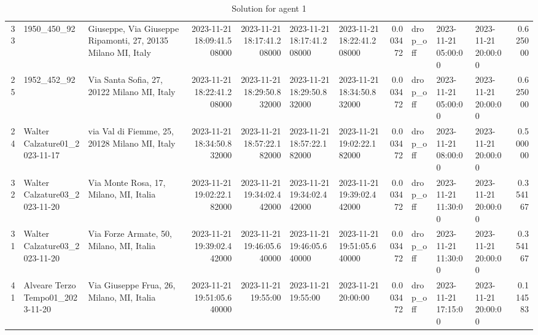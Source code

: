 \documentclass[titlepage]{article}
\begin{document}
\begin{table}[H]
\begin{adjustbox}{max width=\textwidth}
\begin{tabular}{rllrrllrlllr}
33 & 1950\_450\_92 & Giuseppe, Via Giuseppe Ripamonti, 27, 20135 Milano MI, Italy & 2023-11-21 18:09:41.508000 & 2023-11-21 18:17:41.208000 & 2023-11-21 18:17:41.208000 & 2023-11-21 18:22:41.208000 & 0.003472 & drop\_off & 2023-11-21 05:00:00 & 2023-11-21 20:00:00 & 0.625000 \\
25 & 1952\_452\_92 & Via Santa Sofia, 27, 20122 Milano MI, Italy & 2023-11-21 18:22:41.208000 & 2023-11-21 18:29:50.832000 & 2023-11-21 18:29:50.832000 & 2023-11-21 18:34:50.832000 & 0.003472 & drop\_off & 2023-11-21 05:00:00 & 2023-11-21 20:00:00 & 0.625000 \\
24 & Walter Calzature01\_2023-11-17 & via Val di Fiemme, 25, 20128 Milano MI, Italy & 2023-11-21 18:34:50.832000 & 2023-11-21 18:57:22.182000 & 2023-11-21 18:57:22.182000 & 2023-11-21 19:02:22.182000 & 0.003472 & drop\_off & 2023-11-21 08:00:00 & 2023-11-21 20:00:00 & 0.500000 \\
32 & Walter Calzature03\_2023-11-20 & Via Monte Rosa, 17, Milano, MI, Italia & 2023-11-21 19:02:22.182000 & 2023-11-21 19:34:02.442000 & 2023-11-21 19:34:02.442000 & 2023-11-21 19:39:02.442000 & 0.003472 & drop\_off & 2023-11-21 11:30:00 & 2023-11-21 20:00:00 & 0.354167 \\
31 & Walter Calzature03\_2023-11-20 & Via Forze Armate, 50, Milano, MI, Italia & 2023-11-21 19:39:02.442000 & 2023-11-21 19:46:05.640000 & 2023-11-21 19:46:05.640000 & 2023-11-21 19:51:05.640000 & 0.003472 & drop\_off & 2023-11-21 11:30:00 & 2023-11-21 20:00:00 & 0.354167 \\
41 & Alveare Terzo Tempo01\_2023-11-20 & Via Giuseppe Frua, 26, Milano, MI, Italia & 2023-11-21 19:51:05.640000 & 2023-11-21 19:55:00 & 2023-11-21 19:55:00 & 2023-11-21 20:00:00 & 0.003472 & drop\_off & 2023-11-21 17:15:00 & 2023-11-21 20:00:00 & 0.114583 \\
\bottomrule
\end{tabular}
\end{adjustbox}
\caption{Solution for agent 1}
\label{tab:solution1}
\end{table}
\end{document}
